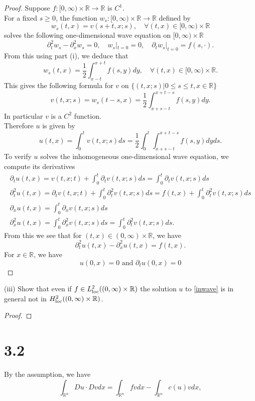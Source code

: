 \documentclass{article}
\newcommand{\R}{\mathbb{R}}
\DeclareMathOperator{\loc}{\textup{loc}}
\begin{document}
\begin{proof}
    Suppose $f:[0,\infty)\times\R\to\R$ is $C^1$.\\
    For a fixed $s\geq 0$, the function $w_s:[0,\infty)\times\R\to\R$ defined by
    \[
    w_s(t,x)=v(s+t,x;s),\quad\forall (t,x)\in [0,\infty)\times\R
    \]
    solves the following one-dimensional wave equation on $[0,\infty)\times\R$
    \[
    \partial_t^2w_s-\partial_x^2w_s=0,\quad w_s|_{t=0}=0,\quad \partial_tw_s|_{t=0}=f(s,\cdot).
    \]
    From this using part (i), we deduce that 
    \[
    w_s(t,x)=\frac{1}{2}\int_{x-t}^{x+t}f(s,y)dy,\quad\forall (t,x)\in [0,\infty)\times\R.
    \]
    This gives the following formula for $v$ on $\{(t,x;s)|0\leq s\leq t, x\in\R\}$
    \[
    v(t,x;s)=w_s(t-s,x)=\frac{1}{2}\int_{x+s-t}^{x+t-s}f(s,y)dy.
    \]
    In particular $v$ is a $C^2$ function.\\
    Therefore $u$ is given by
    \[
    u(t,x)=\int_0^tv(t,x;s)ds=\frac{1}{2}\int_0^t\int_{x+s-t}^{x+t-s}f(s,y)dyds.
    \]
    To verify $u$ solves the inhomogeneous one-dimensional wave equation, we compute its derivatives
    \begin{gather*}
        \partial_tu(t,x)=v(t,x;t)+\int_{0}^t\partial_tv(t,x;s)ds=\int_0^t\partial_tv(t,x;s)ds\\
        \partial_t^2u(t,x)=\partial_tv(t,x;t)+\int_0^t\partial_t^2v(t,x;s)ds=f(t,x)+\int_0^t\partial_t^2v(t,x;s)ds\\
        \partial_xu(t,x)=\int_0^t\partial_xv(t,x;s)ds\\
        \partial_x^2u(t,x)=\int_0^t\partial_x^2v(t,x;s)ds=\int_0^t\partial_t^2v(t,x;s)ds. 
    \end{gather*}
    From this we see that for $(t,x)\in (0,\infty)\times\R$, we have
    \[
    \partial_t^2u(t,x)-\partial_x^2u(t,x)=f(t,x).
    \]
    For $x\in\R$, we have
    \[
    u(0,x)=0\text{ and }\partial_tu(0,x)=0
    \]
\end{proof}
(iii) Show that even if $f\in L^2_{\loc}((0,\infty)\times\R)$ the solution $u$ to \eqref{inwave} is in general not in $H^2_{\loc}((0,\infty)\times\R)$.
\begin{proof}
    
\end{proof}

\section*{3.2}

By the assumption, we have
\begin{equation}
\label{weak_sol}
\int_{\mathbb{R}^n} Du\cdot Dv dx = \int_{\mathbb{R}^n} fvdx - \int_{\mathbb{R}^n}c(u)vdx,
\end{equation}
\end{document}
